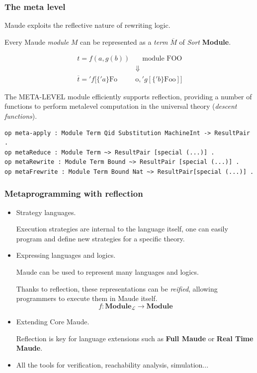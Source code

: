 \documentclass{beamer}
\begin{document}
\begin{frame}[fragile]
    \scriptsize
    \frametitle{The meta level }
    Maude exploits the reflective nature of rewriting logic. 
    
    \bigskip
    Every Maude \emph{module} \textbf{$M$} can be represented  as 
    a \emph{term} \textbf{$\overline{M}$} of \emph{Sort} \textbf{Module}. 

    \begin{align*}
        t=f(a,g(b))& \quad  \text{module FOO}\\
            &\Downarrow \\ 
        \overline{t}='f[\{'a\}\text{Fo}&\text{o},'g[\{'b\}\text{Foo}]]
    \end{align*}

    \bigskip
    The META-LEVEL module efficiently supports reflection, providing a number of functions to 
    perform metalevel computation in the universal theory (\emph{descent functions}).
    \begin{lstlisting}[language=maude]
op meta-apply : Module Term Qid Substitution MachineInt -> ResultPair .
op metaReduce : Module Term ~> ResultPair [special (...)] .
op metaRewrite : Module Term Bound ~> ResultPair [special (...)] .
op metaFrewrite : Module Term Bound Nat ~> ResultPair[special (...)] .    
\end{lstlisting}


\end{frame}

\begin{frame}
    
    \frametitle{Metaprogramming with reflection}
    \small
    \begin{itemize}
        \item Strategy languages. 
        
        Execution strategies are internal to the language itself, one can easily program 
        and define new strategies for a specific theory.
        
        \item Expressing languages and logics. 
        
        Maude can be used to represent many languages and logics. 
    
        Thanks to reflection, these representations can be \emph{reified}, allowing programmers 
        to execute them in Maude itself. 
        $$f:\mathbf{Module_\mathcal{L}} \rightarrow \mathbf{Module}$$
        
        
        \item Extending Core Maude.
        
        Reflection is key for language extensions such as \textbf{Full Maude} or \textbf{Real Time Maude}.
        
        \item All the tools for verification, reachability analysis, simulation...
    \end{itemize}
\end{frame}
\end{document}
